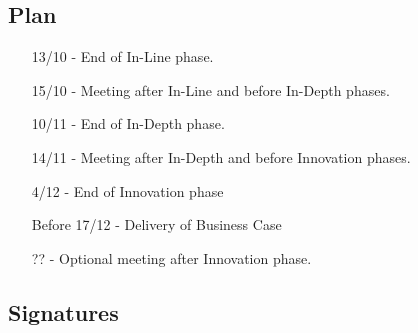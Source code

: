 \subsection{Plan}
\begin{itemize}
\item[13/10] - End of In-Line phase.
\item[15/10] - Meeting after In-Line and before In-Depth phases.
\item[10/11] - End of In-Depth phase.
\item[14/11] - Meeting after In-Depth and before Innovation phases.
\item[4/12] - End of Innovation phase
\item[Before] 17/12 - Delivery of Business Case
\item[??] - Optional meeting after Innovation phase.
\end{itemize}

\subsection{Signatures}
